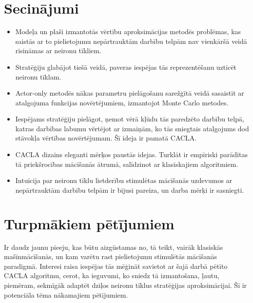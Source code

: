 \documentclass[a0,landscape]{a0poster}
\numberwithin{equation}{section}
\theoremstyle{definition}
\theoremstyle{plain}
\begin{document}
\begin{multicols}{4}
\color{SaddleBrown} %

\section*{Secinājumi}

\begin{itemize}
	\item Modeļa un plaši izmantotās vērtību aproksimācijas metodēs problēmas, kas saistās ar to pielietojumu nepārtrauktām darbību telpām nav vienkāršā veidā risināmas ar neironu tīkliem.
	\item Stratēģiju glabājot tiešā veidā, paveras iespējas tās reprezentēšanu uzticēt neironu tīklam.
	\item Actor-only metodēs nākas parametru pielāgošanu sarežģītā veidā sasaistīt ar atalgojuma funkcijas novērtējumiem, izmantojot Monte Carlo metodes.
	\item Iespējams stratēģiju pielāgot, ņemot vērā kļūdu tās paredzēto darbību telpā, katras darbības labumu vērtējot ar izmaiņām, ko tās sniegtais atalgojums dod stāvokļa vērtības novērtējumam. Šī ideja ir pamatā CACLA.
	\item CACLA dizains eleganti mērķos paustās idejas. Turklāt ir empīriski parādītas tā priekšrocības mācīšanās ātrumā, salīdzinot ar klasiskajiem algoritmiem.
	\item Intuīcija par neironu tīklu lietderību stimulētas mācīšanās uzdevumos ar nepārtrauktām darbību telpām ir bijusi pareiza, un darba mērķi ir sasniegti.
\end{itemize}

\color{DarkSlateGray} %


\section*{Turpmākiem pētījumiem}

Ir daudz jaunu pieeju, kas būtu aizgūstamas no, tā teikt, vairāk klasiskās mašīnmācīšanās, un kam varētu rast pielietojumu stimulētās mācīšanās paradigmā.
Interesi raisa iespējas tās mēģināt savietot ar šajā darbā pētīto CACLA algoritmu, cerot, ka ieguvumi, ko sniedz tā izmantošana, ļautu, piemēram, sekmīgāk adaptēt dziļos neironu tīklus stratēģijas aproksimācijai.
Šī ir potenciāla tēma nākamajiem pētījumiem.


\end{multicols}
\end{document}
